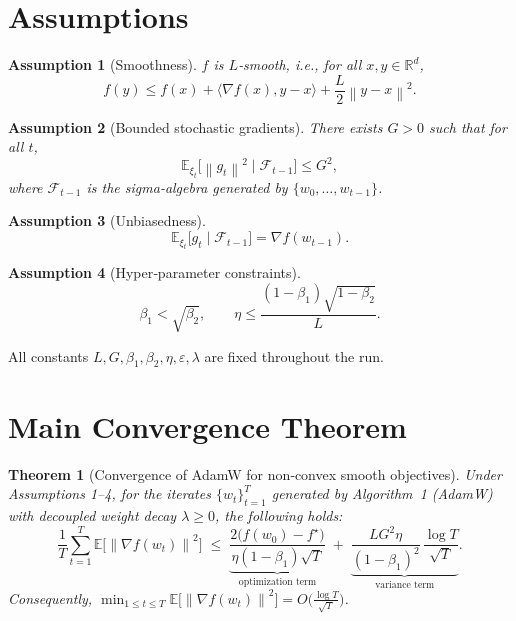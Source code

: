 \documentclass{article}
\newtheorem{theorem}{Theorem}
\newtheorem{assumption}{Assumption}
\newcommand{\E}{\mathbb{E}}
\newcommand{\R}{\mathbb{R}}
\newcommand{\norm}[1]{\left\|#1\right\|}
\newcommand{\ip}[2]{\langle #1,#2\rangle}
\begin{document}
\newpage
\section*{Assumptions}
\begin{assumption}[Smoothness]
$f$ is $L$‑smooth, i.e., for all $x,y\in\R^{d}$,
\[
f(y)\le f(x)+\ip{\nabla f(x)}{y-x}+\frac{L}{2}\norm{y-x}^{2}.
\]
\end{assumption}
\begin{assumption}[Bounded stochastic gradients]
There exists $G>0$ such that for all $t$,
\[
\E_{\xi_{t}}\bigl[\norm{g_{t}}^{2}\mid \mathcal{F}_{t-1}\bigr]\le G^{2},
\]
where $\mathcal{F}_{t-1}$ is the sigma‑algebra generated by $\{w_{0},\dots,w_{t-1}\}$.
\end{assumption}
\begin{assumption}[Unbiasedness]
\[
\E_{\xi_{t}}\bigl[g_{t}\mid \mathcal{F}_{t-1}\bigr]=\nabla f(w_{t-1}) .
\]
\end{assumption}
\begin{assumption}[Hyper‑parameter constraints]
\[
\beta_{1}<\sqrt{\beta_{2}},\qquad
\eta\le \frac{(1-\beta_{1})\sqrt{1-\beta_{2}}}{L}.
\]
\end{assumption}
All constants $L,G,\beta_{1},\beta_{2},\eta,\varepsilon,\lambda$ are fixed throughout the run.

\section*{Main Convergence Theorem}
\begin{theorem}[Convergence of AdamW for non‑convex smooth objectives]\label{thm:main}
Under Assumptions 1–4, for the iterates $\{w_{t}\}_{t=1}^{T}$ generated by
Algorithm~1 (AdamW) with decoupled weight decay $\lambda\ge0$, the following
holds:
\[
\frac{1}{T}\sum_{t=1}^{T}\E\!\bigl[\norm{\nabla f(w_{t})}^{2}\bigr]
\;\le\;
\underbrace{\frac{2\bigl(f(w_{0})-f^{\star}\bigr)}{\eta(1-\beta_{1})\sqrt{T}}}_{\text{optimization term}}
\;+\;
\underbrace{\frac{L G^{2}\eta}{(1-\beta_{1})^{2}}\,\frac{\log T}{\sqrt{T}}}_{\text{variance term}} .
\]
Consequently, $\displaystyle\min_{1\le t\le T}\E\bigl[\norm{\nabla f(w_{t})}^{2}\bigr]
=O\!\bigl(\tfrac{\log T}{\sqrt{T}}\bigr)$.
\end{theorem}
\end{document}
